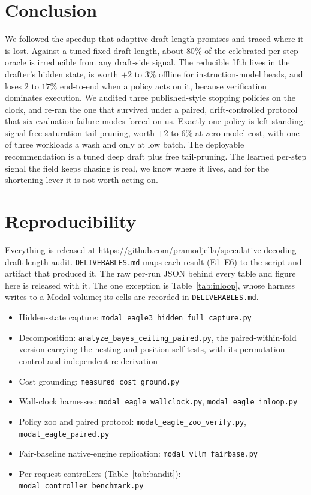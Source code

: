 \documentclass[conference]{IEEEtran}
\begin{document}
\section{Conclusion}
We followed the speedup that adaptive draft length promises and traced where it is lost. Against a
tuned fixed draft length, about $80\%$ of the celebrated per-step oracle is irreducible from
any draft-side signal. The reducible fifth lives in the drafter's hidden state, is worth $+2$
to $3\%$ offline for instruction-model heads, and loses $2$ to $17\%$ end-to-end when a policy
acts on it, because verification dominates execution. We audited three published-style
stopping policies on the clock, and re-ran the one that survived under a paired,
drift-controlled protocol that six evaluation failure modes forced on us. Exactly one policy is left standing: signal-free saturation tail-pruning,
worth $+2$ to $6\%$ at zero model cost, with one of three workloads a wash and only at low
batch. The deployable recommendation
is a tuned deep draft plus free tail-pruning. The learned per-step signal the field keeps
chasing is real, we know where it lives, and for the shortening lever it is not worth acting
on.

\section*{Reproducibility}
Everything is released at
\url{https://github.com/pramodjella/speculative-decoding-draft-length-audit}.
\texttt{DELIVERABLES.md} maps each result (E1--E6) to the script and artifact that produced
it. The raw per-run JSON behind every table and figure here is released with it. The one
exception is Table~\ref{tab:inloop}, whose harness writes to a Modal volume; its cells are
recorded in \texttt{DELIVERABLES.md}.

\begingroup
\small
\begin{itemize}\itemsep1pt \parskip0pt
\item Hidden-state capture: \texttt{modal\_eagle3\_hidden\_\allowbreak full\_capture.py}
\item Decomposition: \texttt{analyze\_bayes\_\allowbreak ceiling\_paired.py}, the
paired-within-fold version carrying the nesting and position self-tests, with its permutation
control and independent re-derivation
\item Cost grounding: \texttt{measured\_cost\_ground.py}
\item Wall-clock harnesses: \texttt{modal\_eagle\_\allowbreak wallclock.py},
\texttt{modal\_eagle\_inloop.py}
\item Policy zoo and paired protocol: \texttt{modal\_eagle\_\allowbreak zoo\_verify.py},
\texttt{modal\_eagle\_paired.py}
\item Fair-baseline native-engine replication: \texttt{modal\_vllm\_fairbase.py}
\item Per-request controllers (Table~\ref{tab:bandit}):
\texttt{modal\_controller\_\allowbreak benchmark.py}
\end{itemize}
\endgroup
\end{document}
